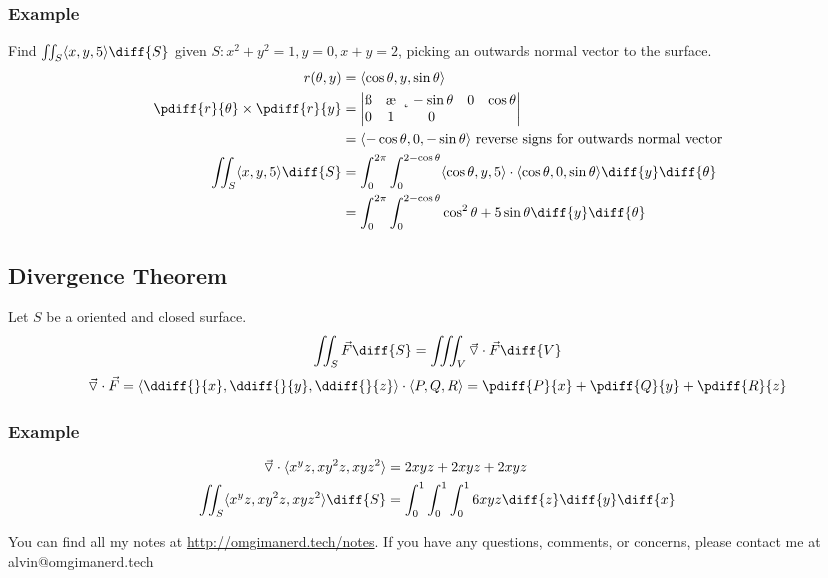 \documentclass{math}
\begin{document}
\subsubsection*{Example}
Find \( \iint_{S}\langle x,y,5\rangle\diff{S} \) given \( S:x^2+y^2 = 1, y = 0,
x+y = 2 \), picking an outwards normal vector to the surface.
\begin{align*}
  r(\theta,y) &= \langle\cos\theta,y,\sin\theta\rangle \\
  \pdiff{r}{\theta}\times\pdiff{r}{y} &= \begin{vmatrix}
    \i & \j & \k \\
    -\sin\theta & 0 & \cos\theta \\
    0 & 1 & 0
  \end{vmatrix} \\
  &= \langle-\cos\theta,0,-\sin\theta\rangle
    \text{ reverse signs for outwards normal vector} \\
  \iint_{S}\langle x,y,5\rangle\diff{S} &=
    \int_{0}^{2\pi}\int_{0}^{2-\cos\theta}\langle\cos\theta,y,5\rangle\cdot
    \langle\cos\theta,0,\sin\theta\rangle\diff{y}\diff{\theta} \\
  &= \int_{0}^{2\pi}\int_{0}^{2-\cos\theta}\cos^2\theta+5\sin\theta
    \diff{y}\diff{\theta} \\
\end{align*}

\subsection*{Divergence Theorem}
Let \( S \) be a oriented and closed surface.
\[ \iint_{S}\vec{F}\diff{S} =
  \iiint_{V}\vec{\triangledown}\cdot\vec{F}\diff{V} \]
\[ \vec{\triangledown}\cdot\vec{F} =
  \langle\ddiff{}{x},\ddiff{}{y},\ddiff{}{z}\rangle\cdot
  \langle P,Q,R\rangle = \pdiff{P}{x}+\pdiff{Q}{y}+\pdiff{R}{z} \]

\subsubsection*{Example}
\begin{align*}
  \vec{\triangledown}\cdot\langle x^yz,xy^2z,xyz^2\rangle &= 2xyz+2xyz+2xyz \\
  \iint_{S}\langle x^yz,xy^2z,xyz^2\rangle\diff{S} &=
    \int_{0}^{1}\int_{0}^{1}\int_{0}^{1}6xyz\diff{z}\diff{y}\diff{x} \\
\end{align*}

\begin{center}
  You can find all my notes at \url{http://omgimanerd.tech/notes}. If you have
  any questions, comments, or concerns, please contact me at
  alvin@omgimanerd.tech
\end{center}
\end{document}
